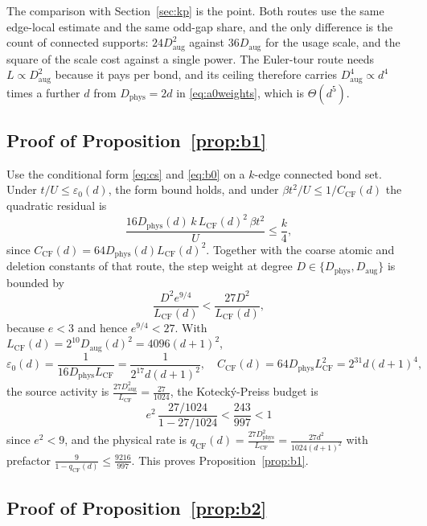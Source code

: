 \documentclass[11pt]{article}
\theoremstyle{plain}
\theoremstyle{definition}
\newcommand{\Dphys}{D_{\mathrm{phys}}}
\newcommand{\Daug}{D_{\mathrm{aug}}}
\begin{document}
The comparison with Section~\ref{sec:kp} is the point. Both routes use the same
edge-local estimate and the same odd-gap share, and the only difference is the count
of connected supports: $24\Daug^2$ against $36\Daug$ for the usage scale, and the
square of the scale cost against a single power. The Euler-tour route needs
$L\propto\Daug^2$ because it pays per bond, and its ceiling therefore carries
$\Daug^4\propto d^4$ times a further $d$ from $\Dphys=2d$ in \eqref{eq:a0weights},
which is $\Theta(d^5)$.

\subsection{Proof of Proposition~\ref{prop:b1}}

Use the conditional form \eqref{eq:cs} and \eqref{eq:b0} on a $k$-edge connected
bond set. Under $t/U\le\varepsilon_0(d)$, the form bound holds, and under
$\beta t^2/U\le1/C_{\mathrm{CF}}(d)$ the quadratic residual is
\begin{equation}\label{eq:b1residual}
 \frac{16\Dphys(d)\,k\,L_{\mathrm{CF}}(d)^2\,\beta t^2}{U}\le\frac k4,
\end{equation}
since $C_{\mathrm{CF}}(d)=64\Dphys(d)L_{\mathrm{CF}}(d)^2$. Together with the coarse
atomic and deletion constants of that route, the step weight at degree
$D\in\{\Dphys,\Daug\}$ is bounded by
\begin{equation}\label{eq:b1weight}
 \frac{D^2e^{9/4}}{L_{\mathrm{CF}}(d)}<\frac{27D^2}{L_{\mathrm{CF}}(d)},
\end{equation}
because $e<3$ and hence $e^{9/4}<27$. With
$L_{\mathrm{CF}}(d)=2^{10}\Daug(d)^2=4096(d+1)^2$,
\begin{equation}\label{eq:b1numbers}
 \varepsilon_0(d)=\frac{1}{16\Dphys L_{\mathrm{CF}}}=\frac{1}{2^{17}d(d+1)^2},\quad
 C_{\mathrm{CF}}(d)=64\Dphys L_{\mathrm{CF}}^2=2^{31}d(d+1)^4,
\end{equation}
the source activity is $\frac{27\Daug^2}{L_{\mathrm{CF}}}=\frac{27}{1024}$, the
Koteck\'y-Preiss budget is
\begin{equation}\label{eq:b1kp}
 e^2\,\frac{27/1024}{1-27/1024}<\frac{243}{997}<1
\end{equation}
since $e^2<9$, and the physical rate is
$q_{\mathrm{CF}}(d)=\frac{27\Dphys^2}{L_{\mathrm{CF}}}=\frac{27d^2}{1024(d+1)^2}$ with
prefactor $\frac{9}{1-q_{\mathrm{CF}}(d)}\le\frac{9216}{997}$. This proves
Proposition~\ref{prop:b1}.

\subsection{Proof of Proposition~\ref{prop:b2}}
\end{document}
